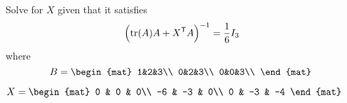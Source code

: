 
\begin{Exercise}[
name={},
title={}, 
difficulty=0,
origin={\cite{YL}}]
Solve for $X$ given that it satisfies
\[
\Big(\text{tr}(A)A+{{X}^{\mathsf{T}}}A\Big)^{-1}=\frac{1}{6}I_3
\]
where
\[
B=
\begin{mat}
1&2&3\\
0&2&3\\
0&0&3\\
\end{mat}\;
\]

\end{Exercise}

\begin{Answer}
$
X=
\begin{mat}
0 & 0 & 0\\
-6 & -3 & 0\\
0 & -3 & -4
\end{mat}
$
\end{Answer}
